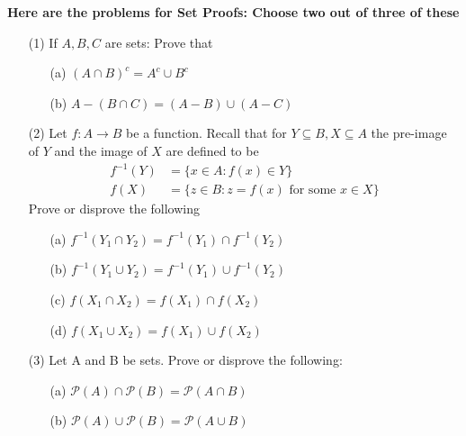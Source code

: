 \documentclass[answers,12pt]{exam}
\newcommand{\br}{\hfill \break}
\newcommand{\bs}{\begin{solution}}
\newcommand{\es}{\end{solution}}
\begin{document}
\br
\textbf{Here are the problems for Set Proofs: Choose two out of three of these}
\begin{enumerate}
    \item [(1)] If \(A,B, C\) are sets: Prove that \begin{enumerate}
        \item [(a)] \((A \cap B)^c = A^c \cup B^c\)
        \item [(b)] \(A - (B \cap C)= (A-B) \cup (A-C)\)
    \end{enumerate}
    \bs
    \es
    
    \item [(2)] Let \(f: A \to B\) be a function. Recall that for \(Y \subseteq B, X \subseteq A\) the pre-image of \(Y\) and the image of \(X\) are defined to be \begin{align*}
        f^{-1}(Y) &= \{x \in A: f(x) \in Y\}\\
        f(X) & = \{z \in B: z = f(x) \text{ for some } x \in X\}
    \end{align*}
    Prove or disprove the following \begin{enumerate}
        \item [(a)] \(f^{-1} (Y_1 \cap Y_2 ) = f^{-1}(Y_1) \cap f^{-1}(Y_2)\)
        \item [(b)] \(f^{-1} (Y_1 \cup Y_2 ) = f^{-1}(Y_1) \cup f^{-1}(Y_2)\)
        \item [(c)] \(f (X_1 \cap X_2 ) = f(X_1) \cap f(X_2)\)
        \item [(d)] \(f (X_1 \cup X_2 ) = f(X_1) \cup f(X_2)\)
    \end{enumerate}
    \bs
    \es
    \item [(3)] Let A and B be sets. Prove or disprove the following: \begin{enumerate}
        \item [(a)] \(\mathcal{P}(A) \cap \mathcal{P}(B) = \mathcal{P}(A \cap B)\)
        \item [(b)]\(\mathcal{P}(A) \cup \mathcal{P}(B) = \mathcal{P}(A \cup B)\)
    \end{enumerate}
    \bs
    \es
\end{enumerate}
\end{document}
